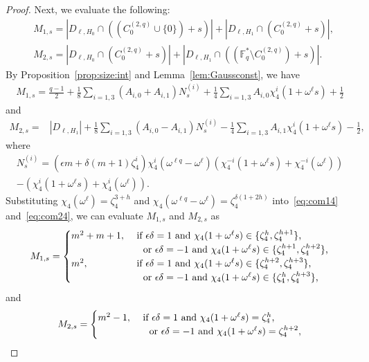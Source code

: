 \documentclass[10pt]{amsart}
\theoremstyle{definition}
\newcommand*\F{{\mathbb F}}
\begin{document}
\begin{proof}
Next, we evaluate the following:
\begin{align*}
&M_{1,s}=|D_{\ell,H_0}\cap ((C_0^{(2,q)}\cup \{0\})+s)|+ |D_{\ell,H_1}\cap (C_0^{(2,q)}+s)|,\\
&M_{2,s}=|D_{\ell,H_0}\cap (C_0^{(2,q)}+s)|+ |D_{\ell,H_1}\cap ((\F_q^\ast \setminus C_0^{(2,q)})+s)|.
\end{align*}
By Proposition~\ref{prop:size:int} and Lemma~\ref{lem:Gaussconst}, we have
\begin{align}
M_{1,s} =\frac{q-1}{2}+\frac{1}{8}\sum_{i=1,3}(A_{i,0}+A_{i,1})N_{s}^{(i)}+\frac{1}{4}\sum_{i=1,3}A_{i,0}\chi_4^i(1+\omega^\ell s) +\frac{1}{2}\label{eq:com14}
\end{align}
and
\begin{align}
M_{2,s}=&|D_{\ell,H_1}|+\frac{1}{8}\sum_{i=1,3}(A_{i,0}-A_{i,1})N_{s}^{(i)}-\frac{1}{4}\sum_{i=1,3}A_{i,1}\chi_4^i(1+\omega^\ell s) -\frac{1}{2}, \label{eq:com24}
\end{align}
where
\begin{multline*}
N_s^{(i)}=(\epsilon m+\delta(m+1)\zeta_4^i)\chi_4^i(\omega^{\ell q}-\omega^\ell) (\chi_4^{-i}(1+\omega^{\ell} s)+\chi_4^{-i}(\omega^{\ell}))\\
 -(\chi_4^i(1+\omega^\ell s)+\chi_4^i(\omega^\ell)).
\end{multline*}
Substituting $\chi_4(\omega^{\ell})=\zeta_4^{3+h}$ and $\chi_4(\omega^{\ell q}-\omega^{\ell})=\zeta_4^{\delta (1+2h)}$ into~\eqref{eq:com14} and~\eqref{eq:com24}, we can evaluate $M_{1,s}$ and $M_{2,s}$ as
\begin{equation*}
M_{1,s}=
\begin{cases}
m^2+m+1,& \text{ if $\epsilon \delta=1$ and $\chi_4(1+\omega^\ell s)\in \{\zeta_4^{h},\zeta_4^{h+1}\}$,} \\
&\text{\quad or $\epsilon \delta=-1$ and $\chi_4(1+\omega^\ell s)\in \{\zeta_4^{h+1},\zeta_4^{h+2}\}$,}
\\
m^2,& \text{ if $\epsilon \delta=1$ and $\chi_4(1+\omega^\ell s)\in \{\zeta_4^{h+2},\zeta_4^{h+3}\}$,}\\
& \text{\quad or $\epsilon \delta=-1$ and $\chi_4(1+\omega^\ell s)\in \{\zeta_4^{h},\zeta_4^{h+3}\}$,}
\end{cases}
\end{equation*}
and
\begin{equation*}
M_{2,s}=
\begin{cases}
m^2-1,& \text{ if $\epsilon \delta=1$ and $\chi_4(1+\omega^\ell s)=\zeta_4^{h}$,}
\\
& \text{\quad or $\epsilon \delta=-1$ and $\chi_4(1+\omega^\ell s)=\zeta_4^{h+2}$,}

\end{cases}
\end{equation*}
\end{proof}
\end{document}
